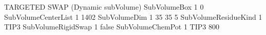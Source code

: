 \documentclass[letterpaper,10pt,english]{sphinxmanual}
\begin{document}
\begin{sphinxVerbatim}[commandchars=\\\{\}]
\PYGZsh{}\PYGZsh{}\PYGZsh{}\PYGZsh{}\PYGZsh{}\PYGZsh{}\PYGZsh{}\PYGZsh{}\PYGZsh{}\PYGZsh{}\PYGZsh{}\PYGZsh{}\PYGZsh{}\PYGZsh{}\PYGZsh{}\PYGZsh{}\PYGZsh{}\PYGZsh{}\PYGZsh{}\PYGZsh{}\PYGZsh{}\PYGZsh{}\PYGZsh{}\PYGZsh{}\PYGZsh{}\PYGZsh{}\PYGZsh{}\PYGZsh{}\PYGZsh{}\PYGZsh{}\PYGZsh{}\PYGZsh{}\PYGZsh{}\PYGZsh{}\PYGZsh{}\PYGZsh{}\PYGZsh{}\PYGZsh{}\PYGZsh{}\PYGZsh{}\PYGZsh{}\PYGZsh{}\PYGZsh{}\PYGZsh{}\PYGZsh{}\PYGZsh{}\PYGZsh{}\PYGZsh{}\PYGZsh{}\PYGZsh{}\PYGZsh{}\PYGZsh{}\PYGZsh{}\PYGZsh{}\PYGZsh{}\PYGZsh{}\PYGZsh{}\PYGZsh{}\PYGZsh{}\PYGZsh{}\PYGZsh{}\PYGZsh{}\PYGZsh{}\PYGZsh{}\PYGZsh{}\PYGZsh{}\PYGZsh{}\PYGZsh{}\PYGZsh{}\PYGZsh{}
\PYGZsh{} TARGETED SWAP (Dynamic subVolume)
\PYGZsh{}\PYGZsh{}\PYGZsh{}\PYGZsh{}\PYGZsh{}\PYGZsh{}\PYGZsh{}\PYGZsh{}\PYGZsh{}\PYGZsh{}\PYGZsh{}\PYGZsh{}\PYGZsh{}\PYGZsh{}\PYGZsh{}\PYGZsh{}\PYGZsh{}\PYGZsh{}\PYGZsh{}\PYGZsh{}\PYGZsh{}\PYGZsh{}\PYGZsh{}\PYGZsh{}\PYGZsh{}\PYGZsh{}\PYGZsh{}\PYGZsh{}\PYGZsh{}\PYGZsh{}\PYGZsh{}\PYGZsh{}\PYGZsh{}\PYGZsh{}\PYGZsh{}\PYGZsh{}\PYGZsh{}\PYGZsh{}\PYGZsh{}\PYGZsh{}\PYGZsh{}\PYGZsh{}\PYGZsh{}\PYGZsh{}\PYGZsh{}\PYGZsh{}\PYGZsh{}\PYGZsh{}\PYGZsh{}\PYGZsh{}\PYGZsh{}\PYGZsh{}\PYGZsh{}\PYGZsh{}\PYGZsh{}\PYGZsh{}\PYGZsh{}\PYGZsh{}\PYGZsh{}\PYGZsh{}\PYGZsh{}\PYGZsh{}\PYGZsh{}\PYGZsh{}\PYGZsh{}\PYGZsh{}\PYGZsh{}\PYGZsh{}\PYGZsh{}\PYGZsh{}
SubVolumeBox                  1       0
SubVolumeCenterList           1       1\PYGZhy{}402
SubVolumeDim                  1       35 35 5
SubVolumeResidueKind          1       TIP3
SubVolumeRigidSwap            1       false
SubVolumeChemPot              1       TIP3    \PYGZhy{}800
\end{sphinxVerbatim}
\end{document}
